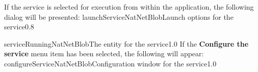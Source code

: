 \insertStandardServiceCommands
\secondaryEnd
\condPage
{}
If the service is selected for execution from within the \emph{\MMMU} application, the
following dialog will be presented:
%
{launchServiceNatNetBlob}{Launch options for the \emph{\NNBI} service}{0.8}

%
{serviceRunningNatNetBlob}{The \emph{\MMMU} entity for the \emph{\NNBI} service}{1.0}
\condPage{}
If the \textbf{Configure the service} menu item has been selected, the following will
appear:
%
{configureServiceNatNetBlob}{Configuration window for the \emph{\NNBI} service}{1.0}
\secondaryEnd
\primaryEnd{}
